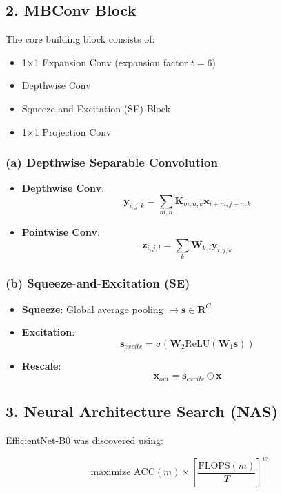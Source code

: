 \documentclass[12pt]{article}
\begin{document}
\begin{appendices}
\subsection*{2. MBConv Block}
The core building block consists of:
\begin{itemize}
    \item 1×1 Expansion Conv (expansion factor $t=6$)
    \item Depthwise Conv
    \item Squeeze-and-Excitation (SE) Block
    \item 1×1 Projection Conv
\end{itemize}

\subsubsection*{(a) Depthwise Separable Convolution}
\begin{itemize}
    \item \textbf{Depthwise Conv}:
    \[
    \mathbf{y}_{i,j,k} = \sum_{m,n} \mathbf{K}_{m,n,k} \mathbf{x}_{i+m, j+n, k}
    \]
    \item \textbf{Pointwise Conv}:
    \[
    \mathbf{z}_{i,j,l} = \sum_k \mathbf{W}_{k,l} \mathbf{y}_{i,j,k}
    \]
\end{itemize}

\subsubsection*{(b) Squeeze-and-Excitation (SE)}
\begin{itemize}
    \item \textbf{Squeeze}: Global average pooling $\rightarrow \mathbf{s} \in \mathbf{R}^C$
    \item \textbf{Excitation}:
    \[
    \mathbf{s}_{excite} = \sigma(\mathbf{W}_2 \text{ReLU}(\mathbf{W}_1 \mathbf{s}))
    \]
    \item \textbf{Rescale}:
    \[
    \mathbf{x}_{out} = \mathbf{s}_{excite} \odot \mathbf{x}
    \]
\end{itemize}

\subsection*{3. Neural Architecture Search (NAS)}
EfficientNet-B0 was discovered using:

\[
\text{maximize } \text{ACC}(m) \times \left[ \frac{\text{FLOPS}(m)}{T} \right]^w
\]


\end{appendices}
\end{document}
